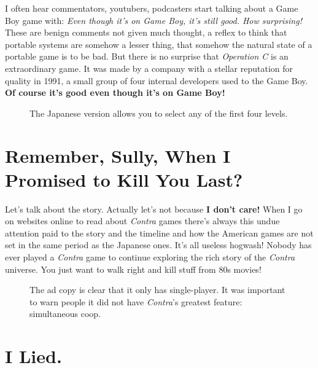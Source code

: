\documentclass{book}
\begin{document}
I often hear commentators, youtubers, podcasters start talking about a Game Boy game with: \emph{Even though it’s on Game Boy, it’s still good. How surprising!} These are benign comments not given much thought, a reflex to think that portable systems are somehow a lesser thing, that somehow the natural state of a portable game is to be bad. But there is no surprise that \emph{Operation C} is an extraordinary game. It was made by a company with a stellar reputation for quality in 1991, a small group of four internal developers used to the Game Boy. \textbf{Of course it’s good even though it’s on Game Boy!}\par
\FloatBarrier\vspace{\baselineskip}\begin{figure}[H]\caption*{The Japanese version allows you to select any of the first four levels.}\end{figure}
\FloatBarrier\section*{Remember, Sully, When I Promised to Kill You Last?}
Let’s talk about the story. Actually let’s not because \textbf{I don’t care!} When I go on websites online to read about \emph{Contra} games there’s always this undue attention paid to the story and the timeline and how the American games are not set in the same period as the Japanese ones. It’s all useless hogwash! Nobody has ever played a \emph{Contra} game to continue exploring the rich story of the \emph{Contra} universe. You just want to walk right and kill stuff from 80s movies!\par
\FloatBarrier\vspace{\baselineskip}\begin{figure}[H]\caption*{The ad copy is clear that it only has single-player. It was important to warn people it did not have \emph{Contra}’s greatest feature: simultaneous coop.}\end{figure}
\FloatBarrier\section*{I Lied.}
\end{document}
